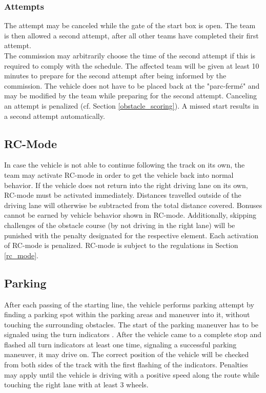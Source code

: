 \subsubsection{Attempts}

The attempt may be canceled while the gate of the start box is open. The team
is then allowed a second attempt, after all other teams have completed their
first attempt.\\ The commission may arbitrarily choose the time of the second
attempt if this is required to comply with the schedule. The affected team will
be given at least 10 minutes to prepare for the second attempt after being
informed by the commission. The vehicle does not have to be placed back at the
"parc-fermé" and may be modified by the team while preparing for the second
attempt. Canceling an attempt is penalized (cf. Section
\ref{obstacle_scoring}). A missed start results in a second attempt
automatically.

\subsection{RC-Mode}

In case the vehicle is not able to continue following the track on its own, the
team may activate RC-mode in order to get the vehicle back into normal
behavior. If the vehicle does not return into the right driving lane on its
own, RC-mode must be activated immediately. Distances travelled outside of the
driving lane will otherwise be subtracted from the total distance covered.
Bonuses cannot be earned by vehicle behavior shown in RC-mode. Additionally,
skipping challenges of the obstacle course (by not driving in the right lane)
will be punished with the penalty designated for the respective element. Each
activation of RC-mode is penalized. RC-mode is subject to the regulations in
Section \ref{rc_mode}.

\subsection{Parking}


After each passing of the starting line, the vehicle performs  parking
attempt by finding a parking spot within the parking areas and maneuver into
it, without touching the surrounding obstacles. The start of the parking
maneuver has to be signaled using the turn indicators . 
After the vehicle came
to a complete stop and flashed all turn indicators at least one time, signaling
a successful parking maneuver, it may drive on. The correct position of the
vehicle will be checked from both sides of the track with the first flashing of
the indicators. Penalties may apply until the vehicle is driving with a
positive speed along the route while touching the right lane with at least 3
wheels.

